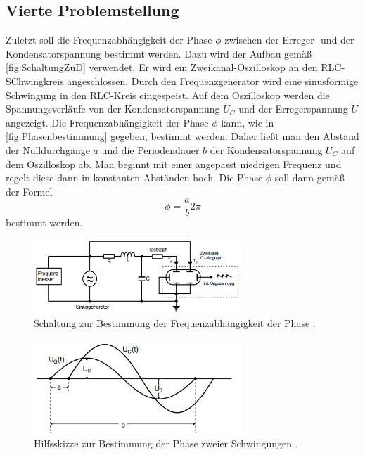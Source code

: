 \subsection{Vierte Problemstellung}
Zuletzt soll die Frequenzabhängigkeit der Phase $\phi$ zwischen der Erreger- und der Kondensatorspannung bestimmt werden. Dazu wird der Aufbau gemäß \autoref{fig:SchaltungZuD} verwendet.
Er wird ein Zweikanal-Oszilloskop an den RLC-SChwingkreis angeschlossen. Durch den Frequenzgenerator wird eine sinusförmige Schwingung in den RLC-Kreis eingespeist.
Auf dem Oszilloskop werden die Spannungsverläufe von der Kondensatorspannung $U_{C}$ und der Erregerspannung $U$ angezeigt. Die Frequenzabhängigkeit der Phase $\phi$ kann, wie 
in \autoref{fig:Phasenbestimmung} gegeben, bestimmt werden. Daher ließt man den Abstand der Nulldurchgänge $a$ und die Periodendauer $b$ der Kondensatorspannung $U_{C}$ auf dem 
Oszilloskop ab. Man beginnt mit einer angepasst niedrigen Frequenz und regelt diese dann in konstanten Abständen hoch. Die Phase $\phi$ soll dann gemäß der Formel 
\begin{equation}
    \phi = \frac{a}{b}2\pi 
\end{equation}
bestimmt werden.
\begin{figure}
    \centering
    \includegraphics[width=0.7\textwidth]{content/SchaltungZuD.pdf}
    \caption{Schaltung zur Bestimmung der Frequenzabhängigkeit der Phase \cite{v354}.}    
    \label{fig:SchaltungZuD}
\end{figure}
\begin{figure}
    \centering
    \includegraphics[width=0.7\textwidth]{content/Phasenbestimmung.pdf}
    \caption{Hilfsskizze zur Bestimmung der Phase zweier Schwingungen \cite{v353}.}    
    \label{fig:Phasenbestimmung}
\end{figure}